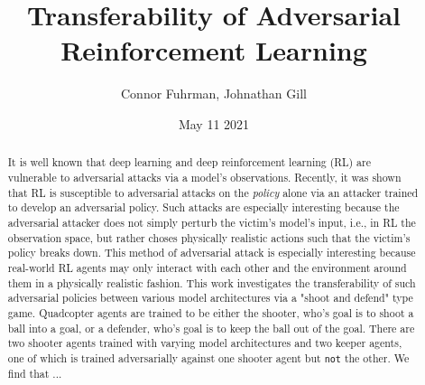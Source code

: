 \documentclass{article}
\title{Transferability of Adversarial Reinforcement Learning}
\author{Connor Fuhrman, Johnathan Gill}
\date{May 11 2021}
\begin{document}
\maketitle

\begin{abstract}
It is well known that deep learning and deep reinforcement learning (RL) are vulnerable to adversarial attacks via a model's observations. 
Recently, it was shown that RL is susceptible to adversarial attacks on the \textit{policy} alone via an attacker trained to develop an adversarial policy. 
Such attacks are especially interesting because the adversarial attacker does not simply perturb the victim's model's input, i.e., in RL the observation space, but rather choses physically realistic actions such that the victim's policy breaks down. 
This method of adversarial attack is especially interesting because real-world RL agents may only interact with each other and the environment around them in a physically realistic fashion. 
This work investigates the transferability of such adversarial policies between various model architectures via a "shoot and defend" type game. 
Quadcopter agents are trained to be either the shooter, who's goal is to shoot a ball into a goal, or a defender, who's goal is to keep the ball out of the goal. 
There are two shooter agents trained with varying model architectures and two keeper agents, one of which is trained adversarially against one shooter agent but \texttt{not} the other. 
We find that ...
\end{abstract}

\newpage
\end{document}

